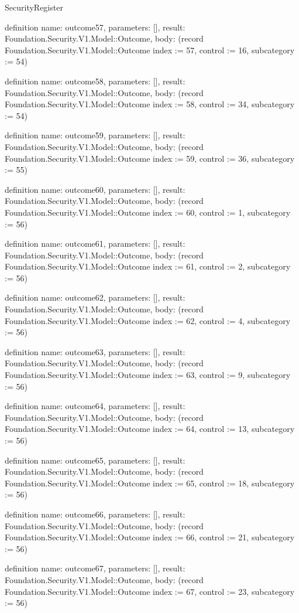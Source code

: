 \begin{lexlean}{SecurityRegister}
\begin{semanticmodule}
definition{
  name: outcome57,
  parameters: [],
  result: Foundation.Security.V1.Model::Outcome,
  body: (record Foundation.Security.V1.Model::Outcome {index := 57, control := 16, subcategory := 54})
}

definition{
  name: outcome58,
  parameters: [],
  result: Foundation.Security.V1.Model::Outcome,
  body: (record Foundation.Security.V1.Model::Outcome {index := 58, control := 34, subcategory := 54})
}

definition{
  name: outcome59,
  parameters: [],
  result: Foundation.Security.V1.Model::Outcome,
  body: (record Foundation.Security.V1.Model::Outcome {index := 59, control := 36, subcategory := 55})
}

definition{
  name: outcome60,
  parameters: [],
  result: Foundation.Security.V1.Model::Outcome,
  body: (record Foundation.Security.V1.Model::Outcome {index := 60, control := 1, subcategory := 56})
}

definition{
  name: outcome61,
  parameters: [],
  result: Foundation.Security.V1.Model::Outcome,
  body: (record Foundation.Security.V1.Model::Outcome {index := 61, control := 2, subcategory := 56})
}

definition{
  name: outcome62,
  parameters: [],
  result: Foundation.Security.V1.Model::Outcome,
  body: (record Foundation.Security.V1.Model::Outcome {index := 62, control := 4, subcategory := 56})
}

definition{
  name: outcome63,
  parameters: [],
  result: Foundation.Security.V1.Model::Outcome,
  body: (record Foundation.Security.V1.Model::Outcome {index := 63, control := 9, subcategory := 56})
}

definition{
  name: outcome64,
  parameters: [],
  result: Foundation.Security.V1.Model::Outcome,
  body: (record Foundation.Security.V1.Model::Outcome {index := 64, control := 13, subcategory := 56})
}

definition{
  name: outcome65,
  parameters: [],
  result: Foundation.Security.V1.Model::Outcome,
  body: (record Foundation.Security.V1.Model::Outcome {index := 65, control := 18, subcategory := 56})
}

definition{
  name: outcome66,
  parameters: [],
  result: Foundation.Security.V1.Model::Outcome,
  body: (record Foundation.Security.V1.Model::Outcome {index := 66, control := 21, subcategory := 56})
}

definition{
  name: outcome67,
  parameters: [],
  result: Foundation.Security.V1.Model::Outcome,
  body: (record Foundation.Security.V1.Model::Outcome {index := 67, control := 23, subcategory := 56})
}


\end{semanticmodule}
\end{lexlean}
